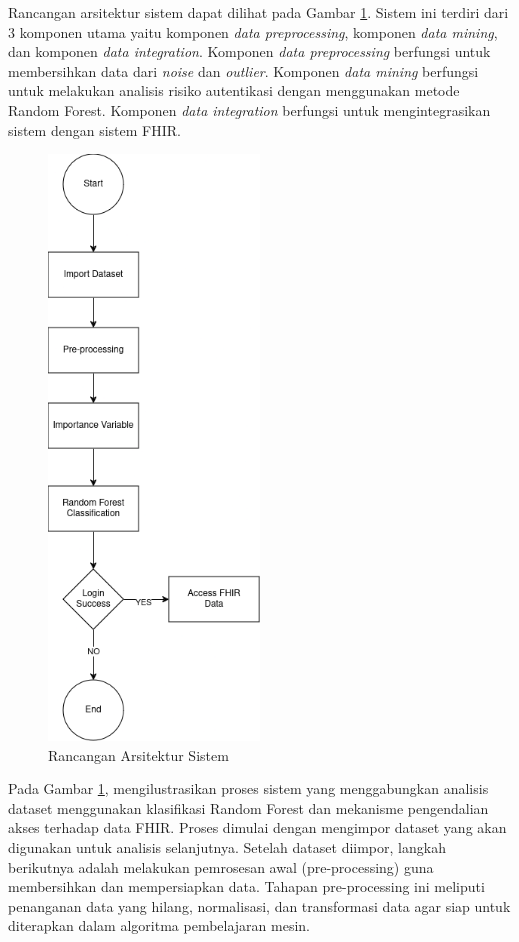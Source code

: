Rancangan arsitektur sistem dapat dilihat pada Gambar \ref{fig:arsitektur-sistem}. Sistem ini terdiri dari 3 komponen utama yaitu komponen \textit{data preprocessing}, komponen \textit{data mining}, dan komponen \textit{data integration}. Komponen \textit{data preprocessing} berfungsi untuk membersihkan data dari \textit{noise} dan \textit{outlier}. Komponen \textit{data mining} berfungsi untuk melakukan analisis risiko autentikasi dengan menggunakan metode Random Forest. Komponen \textit{data integration} berfungsi untuk mengintegrasikan sistem dengan sistem FHIR.

\begin{figure}[H]
    \centering
    \includegraphics[width=0.5\textwidth]{BAB_TESIS/IMAGES/diagram_kusus.drawio.png}
    \caption{Rancangan Arsitektur Sistem}
    \label{fig:arsitektur-sistem}
\end{figure}

Pada Gambar \ref{fig:arsitektur-sistem}, mengilustrasikan proses sistem yang menggabungkan analisis dataset menggunakan klasifikasi Random Forest dan mekanisme pengendalian akses terhadap data FHIR. Proses dimulai dengan mengimpor dataset yang akan digunakan untuk analisis selanjutnya. Setelah dataset diimpor, langkah berikutnya adalah melakukan pemrosesan awal (pre-processing) guna membersihkan dan mempersiapkan data. Tahapan pre-processing ini meliputi penanganan data yang hilang, normalisasi, dan transformasi data agar siap untuk diterapkan dalam algoritma pembelajaran mesin.


